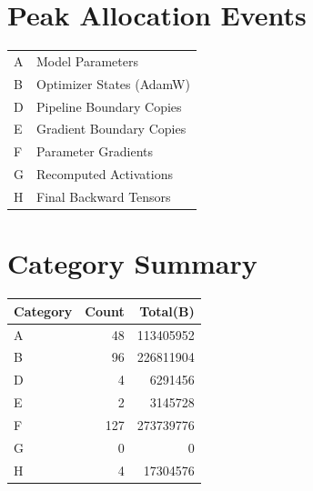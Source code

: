\documentclass{article}
\begin{document}
\section*{Peak Allocation Events}
\small
\begin{tabular}{ll}
A & Model Parameters \\
B & Optimizer States (AdamW) \\
D & Pipeline Boundary Copies \\
E & Gradient Boundary Copies \\
F & Parameter Gradients \\
G & Recomputed Activations \\
H & Final Backward Tensors \\
\end{tabular}
\vspace{0.5em}
\section*{Category Summary}
\begin{tabular}{l r r}
Category & Count & Total(B) \\
\hline
A & 48 & 113405952 \\
B & 96 & 226811904 \\
D & 4 & 6291456 \\
E & 2 & 3145728 \\
F & 127 & 273739776 \\
G & 0 & 0 \\
H & 4 & 17304576 \\
\end{tabular}
\vspace{0.5em}
\end{document}
